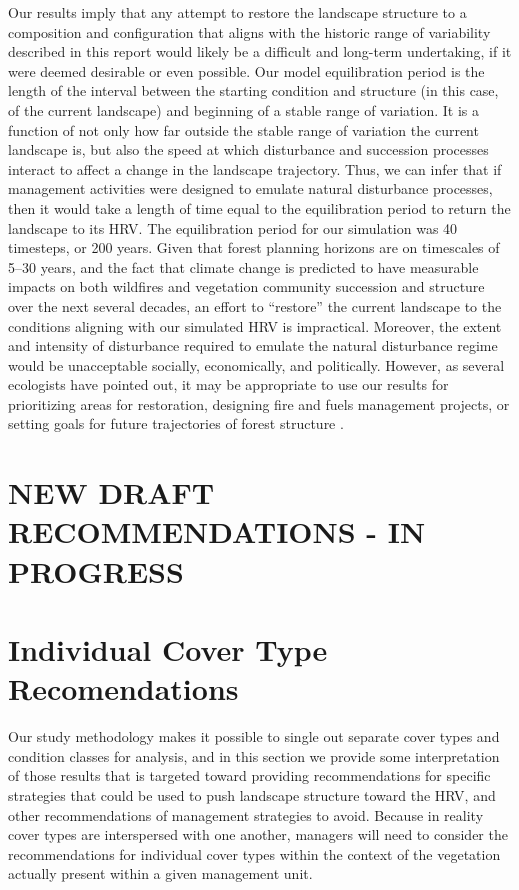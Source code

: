 
Our results imply that any attempt to restore the landscape structure to a composition and configuration that aligns with the historic range of variability described in this report would likely be a difficult and long-term undertaking, if it were deemed desirable or even possible. Our model equilibration period is the length of the interval between the starting condition and structure (in this case, of the current landscape) and beginning of a stable range of variation. It is a function of not only how far outside the stable range of variation the current landscape is, but also the speed at which disturbance and succession processes interact to affect a change in the landscape trajectory. Thus, we can infer that if management activities were designed to emulate natural disturbance processes, then it would take a length of time equal to the equilibration period to return the landscape to its HRV. The equilibration period for our simulation was 40 timesteps, or 200 years. Given that forest planning horizons are on timescales of 5--30 years, and the fact that climate change is predicted to have measurable impacts on both wildfires and vegetation community succession and structure over the next several decades, an effort to ``restore'' the current landscape to the conditions aligning with our simulated HRV is impractical. Moreover, the extent and intensity of disturbance required to emulate the natural disturbance regime would be unacceptable socially, economically, and politically. However, as several ecologists have pointed out, it may be appropriate to use our results for prioritizing areas for restoration, designing fire and fuels management projects, or setting goals for future trajectories of forest structure \citep{Safford2013,Keeley2000}.

\section{ NEW DRAFT RECOMMENDATIONS - IN PROGRESS}
\section{Individual Cover Type Recomendations}
Our study methodology makes it possible to single out separate cover types and condition classes for analysis, and in this section we provide some interpretation of those results that is targeted toward providing recommendations for specific strategies that could be used to push landscape structure toward the HRV, and other recommendations of management strategies to avoid. Because in reality cover types are interspersed with one another, managers will need to consider the recommendations for individual cover types within the context of the vegetation actually present within a given management unit.

